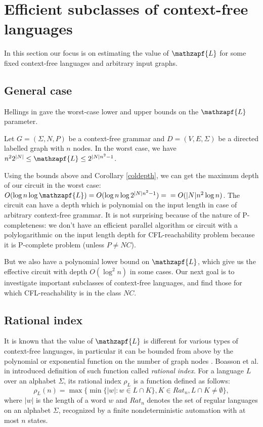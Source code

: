 \section{Efficient subclasses of context-free languages}
\label{sec:CF}
In this section our focus is on estimating the value of $\mathzapf{L}$ for some fixed context-free languages and arbitrary input graphs. 
\subsection{General case}
Hellings in \cite{HellingsCFPQ} gave the worst-case lower and upper bounds on the $\mathzapf{L}$ parameter.
\begin{theorem}[Hellings]
Let  $G = (\Sigma, N, P)$ be a context-free grammar and $D=(V, E, \Sigma)$ be a directed labelled graph with $n$ nodes. In the worst case, we have $ n^22^{|N|}\le \mathzapf{L} \le 2^{|N|n^2-1}$.
\end{theorem}


Using the bounds above and Corollary \ref{coldepth}, we can get the maximum depth of our circuit in the worst case: 
$O(\log n \log \mathzapf{L}) = O(\log n \log 2^{|N|n^2-1}) = \\ = O(|N|n^2\log n)$. The circuit can have a depth which is polynomial on the input length in case of arbitrary context-free grammar. It is not surprising because of the nature of P-completeness: we don't have an efficient parallel algorithm or circuit with a polylogarithmic on the input length depth for CFL-reachability problem because it is P-complete problem (unless $P \neq NC$).


But we also have a polynomial lower bound on $\mathzapf{L}$, which give us the effective circuit with depth $O(\log^2 n)$ in some cases. Our next goal is to investigate important subclasses of context-free languages, and find those for which CFL-reachability is in the class $NC$.
\subsection{Rational index}
It is known that the value of $\mathzapf{L}$ is different for various types of context-free languages, in particular it can be bounded from above by the polynomial or exponential function on the number of graph nodes \cite*{Dyck1, CFRat, GreibRat}. Boasson et al. in \cite{RatBasic} introduced definition of such function called \textit{rational index}. For a language $L$ over an alphabet $\Sigma$, its rational index $\rho_L$ is a function defined as follows:
\begin{equation}
\rho_L(n) = \max\{\min\{|w|:w \in L \cap K\}, K \in {Rat}_n, L \cap K \neq \emptyset\},
\end{equation} where $|w|$ is the length of a word $w$ and ${Rat}_n$ denotes the set of regular languages on an alphabet $\Sigma$, recognized by a finite nondeterministic automation with at most $n$ states.



